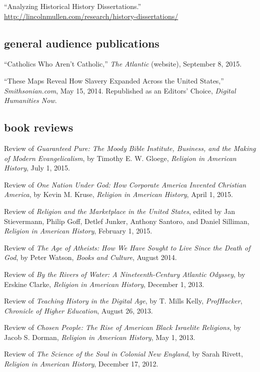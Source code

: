 \documentclass[11pt]{article}
\begin{document}
``Analyzing Historical History Dissertations.'' \url{http://lincolnmullen.com/research/history-dissertations/}

\subsection{general audience publications}\label{selected-online-essays}

``Catholics Who Aren't Catholic,'' \emph{The Atlantic} (website), September 8, 
2015.

``These Maps Reveal How Slavery Expanded Across the United States,''
\emph{Smithsonian.com}, May 15, 2014. Republished as an Editors' Choice,
\emph{Digital Humanities Now}.

\subsection{book reviews}\label{book-reviews}

Review of \emph{Guaranteed Pure: The Moody Bible Institute, Business, and the 
  Making of Modern Evangelicalism}, by Timothy E. W. Gloege, \emph{Religion in 
  American History}, July 1, 2015.

Review of \emph{One Nation Under God: How Corporate America Invented Christian 
  America}, by Kevin M. Kruse, \emph{Religion in American History}, April 1, 
2015.

Review of \emph{Religion and the Marketplace in the United States},
edited by Jan Stievermann, Philip Goff, Detlef Junker, Anthony Santoro,
and Daniel Silliman, \emph{Religion in American History}, February 1,
2015.

Review of \emph{The Age of Atheists: How We Have Sought to Live Since
  the Death of God}, by Peter Watson, \emph{Books and Culture}, August
2014.

Review of \emph{By the Rivers of Water: A Nineteenth-Century Atlantic
  Odyssey}, by Erskine Clarke, \emph{Religion in American History},
December 1, 2013.

Review of \emph{Teaching History in the Digital Age}, by T. Mills Kelly,
\emph{ProfHacker}, \emph{Chronicle of Higher Education}, August 26,
2013.

Review of \emph{Chosen People: The Rise of American Black Israelite
  Religions}, by Jacob S. Dorman, \emph{Religion in American History}, May
1, 2013.

Review of \emph{The Science of the Soul in Colonial New England}, by
Sarah Rivett, \emph{Religion in American History}, December 17, 2012.
\end{document}
